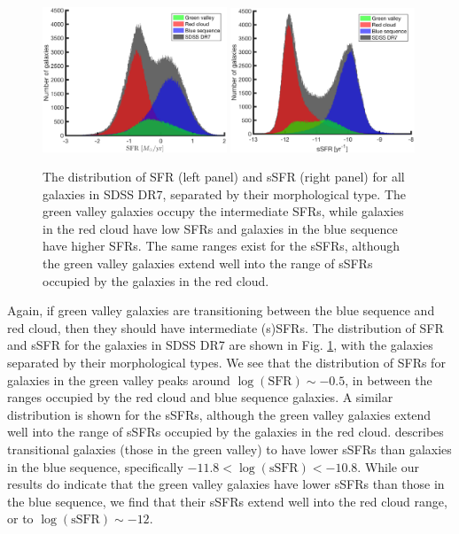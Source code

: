 \begin{figure}
    \includegraphics[width=0.49\textwidth]{Images/GV/SFR_hist}
    \includegraphics[width=0.49\textwidth]{Images/GV/sSFR_hist}
    \caption[(s)SFR distribution by morphological type]{The distribution of SFR 
    (left panel) and sSFR (right panel) for all galaxies in SDSS DR7, separated 
    by their morphological type.  The green valley galaxies occupy the 
    intermediate SFRs, while galaxies in the red cloud have low SFRs and 
    galaxies in the blue sequence have higher SFRs.  The same ranges exist for 
    the sSFRs, although the green valley galaxies extend well into the range of 
    sSFRs occupied by the galaxies in the red cloud.}
    \label{fig:SFR_hist}
\end{figure}

Again, if green valley galaxies are transitioning between the blue sequence and 
red cloud, then they should have intermediate (s)SFRs.  The distribution of SFR 
and sSFR for the galaxies in SDSS DR7 are shown in Fig. \ref{fig:SFR_hist}, with 
the galaxies separated by their morphological types.  We see that the 
distribution of SFRs for galaxies in the green valley peaks around 
$\log(\text{SFR}) \sim -0.5$, in between the ranges occupied by the red cloud 
and blue sequence galaxies.  A similar distribution is shown for the sSFRs, 
although the green valley galaxies extend well into the range of sSFRs occupied 
by the galaxies in the red cloud.  \cite{Salim14a} describes transitional 
galaxies (those in the green valley) to have lower sSFRs than galaxies in the 
blue sequence, specifically $-11.8 < \log(\text{sSFR}) < -10.8$.  While our 
results do indicate that the green valley galaxies have lower sSFRs than those 
in the blue sequence, we find that their sSFRs extend well into the red cloud 
range, or to $\log(\text{sSFR}) \sim -12$.


